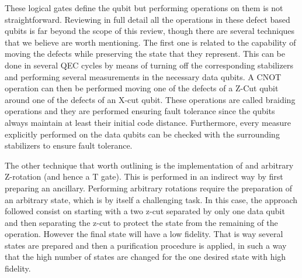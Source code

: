 These logical gates define the qubit but performing operations on them is not
straightforward. Reviewing in full detail all the operations in these defect
based qubits is far beyond the scope of this review, though there are several
techniques that we believe are worth mentioning. The first one is related to the
capability of moving the defects while preserving the state that they represent.
This can be done in several QEC cycles by means of turning off the corresponding
stabilizers and performing several measurements in the necessary data qubits. A
CNOT operation can then be performed moving one of the defects of a Z-Cut qubit
around one of the defects of an X-cut qubit. These operations are called
braiding operations and they are performed ensuring fault tolerance since the
qubits always maintain at least their initial code distance. Furthermore, every
measure explicitly performed on the data qubits can be checked with the
surrounding stabilizers to ensure fault tolerance.

The other technique that worth outlining is the implementation of and arbitrary
Z-rotation (and hence a T gate). This is performed in an indirect way by first
preparing an ancillary. Performing arbitrary rotations require the preparation
of an arbitrary state, which is by itself a challenging task. In this case, the
approach followed consist on starting with a two z-cut separated by only one
data qubit and then separating the z-cut to protect the state from the remaining
of the operation. However the final state will have a low fidelity. That is way
several states are prepared and then a purification procedure is applied, in
such a way that the high number of states are changed for the one desired state
with high fidelity.



